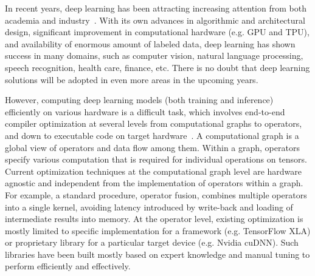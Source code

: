 In recent years, deep learning has been attracting increasing attention from both academia and industry~\cite{lecun2015deep}. With its own advances in algorithmic and architectural design, significant improvement in computational hardware (e.g. GPU and TPU), and availability of enormous amount of labeled data, deep learning has shown success in many domains, such as computer vision, natural language processing, speech recognition, health care, finance, etc. There is no doubt that deep learning solutions will be adopted in even more areas in the upcoming years. 




However, computing deep learning models (both training and inference) efficiently on various hardware is a difficult task, which involves end-to-end compiler optimization at several levels from computational graphs to operators, and down to executable code on target hardware~\cite{Chen18}. A computational graph is a global view of operators and data flow among them. Within a graph, operators specify various computation that is required for individual operations on tensors. Current optimization techniques at the computational graph level are hardware agnostic and independent from the implementation of operators within a graph. For example, a standard procedure, operator fusion, combines multiple operators into a single kernel, avoiding latency introduced by write-back and loading of intermediate results into memory. At the operator level, existing optimization is mostly limited to specific implementation for a framework (e.g. TensorFlow XLA) or proprietary library for a particular target device (e.g. Nvidia cuDNN). Such libraries have been built mostly based on expert knowledge and manual tuning to perform efficiently and effectively. 


